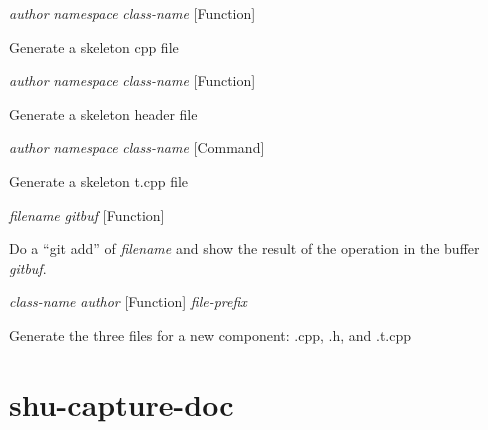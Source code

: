 \vspace{1em}
\noindent
{}
\usebox{\funcname}\emph{author} \emph{namespace} \emph{class-name}
 \hfill [Function]

\begin{doc-string}
Generate a skeleton cpp file
\end{doc-string}

\vspace{1em}
\noindent
{}
\usebox{\funcname}\emph{author} \emph{namespace} \emph{class-name}
 \hfill [Function]

\begin{doc-string}
Generate a skeleton header file
\end{doc-string}

\vspace{1em}
\noindent
{}
\usebox{\funcname}\emph{author} \emph{namespace} \emph{class-name}
 \hfill [Command]

\begin{doc-string}
Generate a skeleton t.cpp file
\end{doc-string}

\vspace{1em}
\noindent
{}
\usebox{\funcname}\emph{filename} \emph{gitbuf}
 \hfill [Function]

\begin{doc-string}
Do a ``git add'' of \emph{filename} and show the result of the operation in
the buffer \emph{gitbuf}.
\end{doc-string}

\vspace{1em}
\noindent
{}
\usebox{\funcname}\emph{class-name} \emph{author}
 \hfill [Function]
\hspace*{\wd\funcname}\emph{file-prefix}

\begin{doc-string}
Generate the three files for a new component: .cpp, .h, and .t.cpp
\end{doc-string}

\eject
\section{shu-capture-doc}


